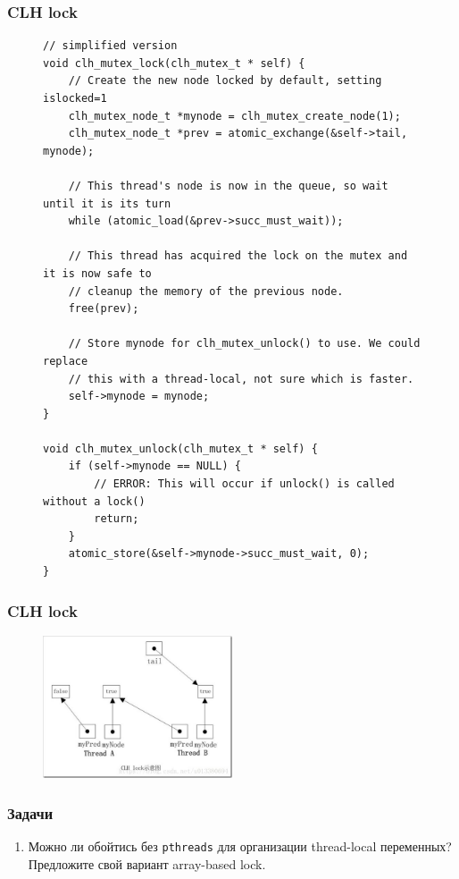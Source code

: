\documentclass[aspectratio=169, pdf, 8pt, unicode]{beamer}
\begin{document}
\begin{frame}[fragile]
\frametitle{CLH lock}
\begin{figure}[H]
\begin{minipage}{0.8\textwidth}
\small
\begin{verbatim}
// simplified version
void clh_mutex_lock(clh_mutex_t * self) {
    // Create the new node locked by default, setting islocked=1
    clh_mutex_node_t *mynode = clh_mutex_create_node(1);
    clh_mutex_node_t *prev = atomic_exchange(&self->tail, mynode);

    // This thread's node is now in the queue, so wait until it is its turn
    while (atomic_load(&prev->succ_must_wait));

    // This thread has acquired the lock on the mutex and it is now safe to
    // cleanup the memory of the previous node.
    free(prev);

    // Store mynode for clh_mutex_unlock() to use. We could replace
    // this with a thread-local, not sure which is faster.
    self->mynode = mynode;
}

void clh_mutex_unlock(clh_mutex_t * self) {
    if (self->mynode == NULL) {
        // ERROR: This will occur if unlock() is called without a lock()
        return;
    }
    atomic_store(&self->mynode->succ_must_wait, 0);
}
\end{verbatim}
\end{minipage}
\end{figure}
\end{frame}

\begin{frame}[fragile]
\frametitle{CLH lock}
\begin{figure}[H]
\includegraphics[width=0.5\textwidth]{fig/clh.jpeg}
\end{figure}
\end{frame}

\begin{frame}
\frametitle{Задачи}
\begin{enumerate}
\item Можно ли обойтись без \texttt{pthreads} для организации thread-local переменных? Предложите свой вариант array-based lock.
\end{enumerate}

\end{frame}
\end{document}
